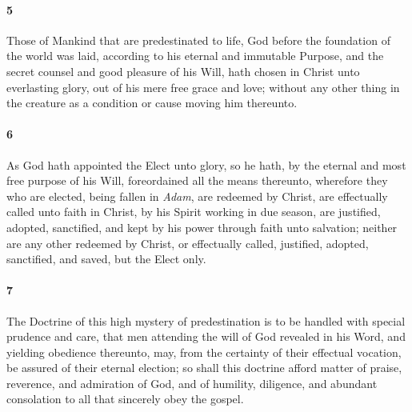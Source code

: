 \documentclass[
    paper=letterpaper,
    11pt,
    twoside,
    DIV=calc,
    openany
]{scrbook}
\newcommand{\ERRATA}[1]{}
\newcommand{\oldgrammar}[2]{#2}
\begin{document}
\footnotebegin
{}
\footnoteend

\paragraph{5} %
Those of Mankind \R{}that are predestinated to life, God before the foundation of the world was laid, according to his eternal and immutable Purpose, and the secret counsel and good pleasure of his Will, hath chosen in Christ unto everlasting glory, out of his mere free grace and love; \R{}without any other thing in the creature as a condition or cause moving him thereunto.

\footnotebegin
{}
\ERRATA{
1688: Ephesians 1:6,12
1719: Ephesians 2:6,12
lbcw & Reni: Ephesians 2:5,12
2:5,12 seem most correct
}
\footnoteend

\paragraph{6} %
As God hath appointed the Elect unto glory, so he hath, by the eternal and most free purpose of his Will, foreordained \R{}all the means thereunto, wherefore they who are elected, being \oldgrammar{fal'n}{fallen} in \textit{Adam}, \R{}are redeemed by Christ, are effectually \R{}called unto faith in Christ, by his Spirit working in due season, are justified, adopted, sanctified, and kept by his power through faith \R{}unto salvation; neither are any other redeemed by Christ, or effectually called, justified, adopted, sanctified, and saved, but the Elect \R{}only.

\footnotebegin
{}
\footnoteend

\paragraph{7} %
The Doctrine of this high mystery of predestination is to be handled with special prudence and care, that men attending the will of God revealed in his Word, and yielding obedience thereunto, may, from the certainty of their effectual vocation, be assured of their \R{}eternal election; so shall this doctrine afford matter \R{}of praise, reverence, and admiration of God, and \R{}of humility, diligence, and abundant \R{}consolation to all that sincerely obey the gospel.
\end{document}
